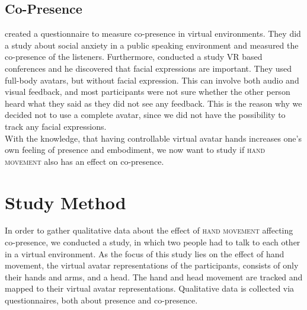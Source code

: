 \documentclass[english,runningheads,a4paper]{llncs}[2018/03/10]
\begin{document}
\subsection{Co-Presence}
\label{subsec:copre}

\citet{poeschl2015measuring} created a questionnaire to measure co-presence in virtual environments. 
They did a study about social anxiety in a public speaking environment and measured the co-presence of the listeners.
Furthermore, \citet{staahl1999meetings} conducted a study VR based conferences and he discovered that facial expressions are important. 
They used full-body avatars, but without facial expression.
This can involve both audio and visual feedback, and most participants were not sure whether the other person heard what they said as they did not see any feedback. 
This is the reason why we decided not to use a complete avatar, since we did not have the possibility to track any facial expressions. \\ \linebreak
With the knowledge, that having controllable virtual avatar hands increases one's own feeling of presence and embodiment, we now want to study if \textsc{hand movement} also has an effect on co-presence. 

\section{Study Method}
\label{sec:study}

In order to gather qualitative data about the effect of \textsc{hand movement} affecting co-presence, we conducted a study, in which two people had to talk to each other in a virtual environment.
As the focus of this study lies on the effect of hand movement, the virtual avatar representations of the participants, consists of only their hands and arms, and a head. 
The hand and head movement are tracked and mapped to their virtual avatar representations. 
Qualitative data is collected via questionnaires, both about presence and co-presence.
\end{document}
